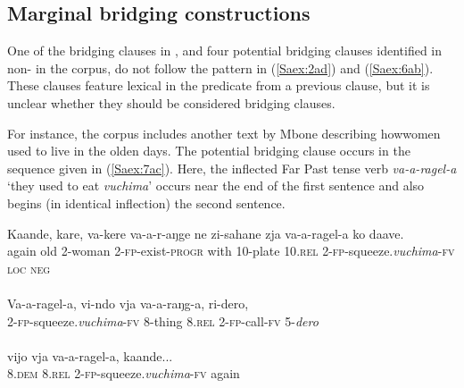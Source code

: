 \documentclass[output=paper]{LSP/langsci}
\begin{document}
\subsection{Marginal bridging constructions}
\label{Samarginal}
One of the bridging clauses in \citet{Chesi2014}, and four potential bridging clauses identified in non- in the corpus, do not follow the pattern in (\ref{Saex:2ad}) and (\ref{Saex:6ab}). These clauses feature lexical  in the predicate from a previous clause, but it is unclear whether they should be considered bridging clauses. 

For instance, the corpus includes another text by Mbone describing how\linebreak women used to live in the olden days. The potential bridging clause occurs in the sequence given in (\ref{Saex:7ac}). Here, the inflected Far Past tense verb \textit{va-a-ragel-a} `they used to eat \textit{vuchima}' occurs near the end of the first  sentence and also begins (in identical inflection) the second sentence. 
 
\begin{exe}
\ex \label{Saex:7ac}
\begin{xlist}
\ex \label{Saex:7a}
\gll Kaande,  kare,  va-kere   va-a-r-aŋge     ne   zi-sahane  zja   va-a-ragel-a       ko   daave. \\
again    old  \textsc{2}-woman  \textsc{2}-\textsc{fp}-exist-\textsc{progr}  with  \textsc{10}-plate  \textsc{10}.\textsc{rel}  \textsc{2}-\textsc{fp}-squeeze.\textit{vuchima}-\textsc{fv}  \textsc{loc}  \textsc{neg}\\
\glt {}\\
\ex \label{Saex:7b}
\gll Va-a-ragel-a,       vi-ndo   vja   va-a-raŋg-a,  ri-dero,  \\
   \textsc{2}-\textsc{fp}-squeeze.\textit{vuchima}-\textsc{fv} \textsc{8}-thing  \textsc{8}.\textsc{rel}  \textsc{2}-\textsc{fp-}call-\textsc{fv}  \textsc{5}-\textit{dero}  \\
   \glt {} \\
\ex \label{Saex:7c}
\gll vijo   vja   va-a-ragel-a,       kaande...\\     	       
    \textsc{8}.\textsc{dem}  \textsc{8}.\textsc{rel}  \textsc{2}-\textsc{fp}-squeeze.\textit{vuchima}-\textsc{fv}  again\\
\glt {} 
\end{xlist}
\end{exe}
\end{document}
